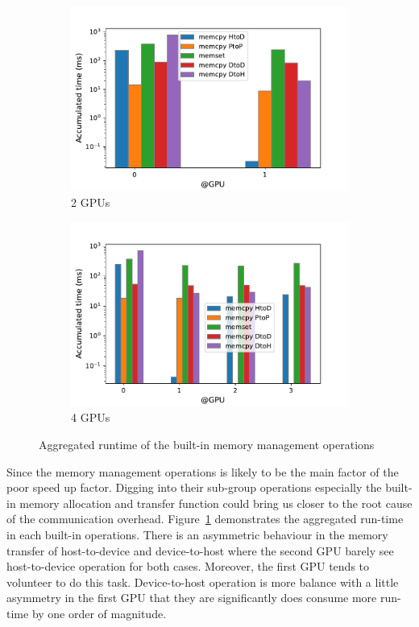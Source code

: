 \begin{figure}[htbp]
    \centering
    \begin{subfigure}{.5\textwidth}
      \centering
      \includegraphics[width=\linewidth]{fig/bert/mem_2gpus.pdf}
      \caption{2 GPUs}
    \end{subfigure}%
    \begin{subfigure}{.5\textwidth}
      \centering
      \includegraphics[width=\linewidth]{fig/bert/mem_4gpus.pdf}
      \caption{4 GPUs}
    \end{subfigure}
    \caption{Aggregated runtime of the built-in memory management operations}
\label{fig:bert:mem_mgnt}
\end{figure}


Since the memory management operations is likely to be the main factor of the poor speed up factor. Digging into their sub-group operations especially the built-in memory allocation and transfer function could bring us closer to the root cause of the communication overhead. Figure~\ref{fig:bert:mem_mgnt} demonstrates the aggregated run-time in each built-in operations. There is an asymmetric behaviour in the memory transfer of host-to-device and device-to-host where the second GPU barely see host-to-device operation for both cases. Moreover, the first GPU tends to volunteer to do this task. Device-to-host operation is more balance with a little asymmetry in the first GPU that they are significantly does consume more run-time by one order of magnitude.


